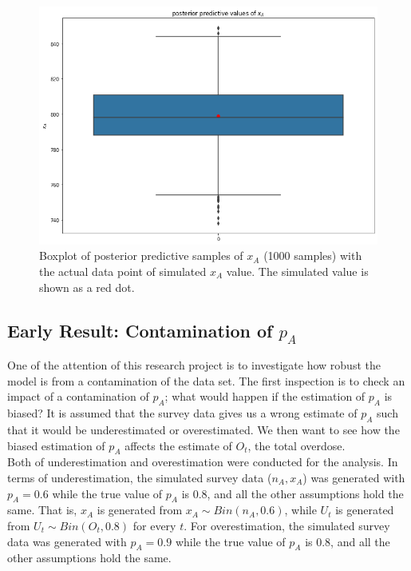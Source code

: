 \documentclass[
10pt, %
a4paper, %
oneside, %
headinclude,footinclude, %
BCOR5mm, %
]{scrartcl}
\begin{document}
\begin{figure}[htb]
	\centering
	\includegraphics[width=1\linewidth]{Figures/early_r_ppc1_xt.png}
	\caption{Boxplot of posterior predictive samples of $x_A$ (1000 samples) with the actual data point of simulated $x_A$ value. The simulated value is shown as a red dot.}
	\label{ppc_xt}
\end{figure}

\subsection{Early Result: Contamination of $p_A$ } 
One of the attention of this research project is to investigate how robust the model is from a contamination of the data set. The first inspection is to check an impact of a contamination of $p_A$; what would happen if the estimation of $p_A$ is biased? It is assumed that the survey data gives us a wrong estimate of $p_A$ such that it would be underestimated or overestimated. We then want to see how the biased estimation of $p_A$ affects the estimate of $O_t$, the total overdose.\\

Both of underestimation and overestimation were conducted for the analysis. In terms of underestimation, the simulated survey data ($n_A, x_A$) was generated with $p_A=0.6$ while the true value of $p_A$ is 0.8, and all the other assumptions hold the same. That is, $x_A$ is generated from $x_A \sim Bin(n_A, 0.6)$, while $U_t$ is generated from $U_t \sim Bin(O_t, 0.8)$ for every $t$. For overestimation, the simulated survey data was generated with $p_A=0.9$ while the true value of $p_A$ is 0.8, and all the other assumptions hold the same.  \\
\end{document}
